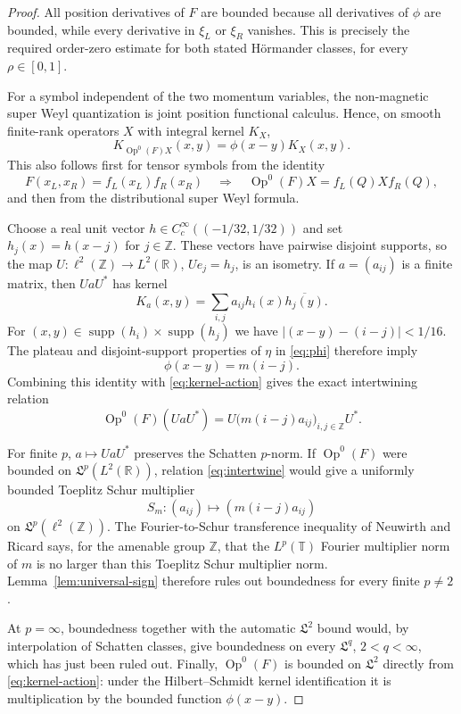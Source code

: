 \documentclass[11pt]{article}
\newcommand{\T}{\mathbb T}
\newcommand{\Z}{\mathbb Z}
\newcommand{\R}{\mathbb R}
\newcommand{\Sp}{\mathfrak L}
\begin{document}
\begin{proof}
All position derivatives of $F$ are bounded because all derivatives of
$\phi$ are bounded, while every derivative in $\xi_L$ or $\xi_R$ vanishes.
This is precisely the required order-zero estimate for both stated
H\"ormander classes, for every $\rho\in[0,1]$.

For a symbol independent of the two momentum variables, the non-magnetic
super Weyl quantization is joint position functional calculus.  Hence, on
smooth finite-rank operators $X$ with integral kernel $K_X$,
\begin{equation}\label{eq:kernel-action}
  K_{\operatorname{Op}^0(F)X}(x,y)=\phi(x-y)K_X(x,y).
\end{equation}
This also follows first for tensor symbols from the identity
\[
  F(x_L,x_R)=f_L(x_L)f_R(x_R)
  \quad\Longrightarrow\quad
  \operatorname{Op}^0(F)X=f_L(Q)Xf_R(Q),
\]
and then from the distributional super Weyl formula.

Choose a real unit vector $h\in C_c^\infty((-1/32,1/32))$ and set
$h_j(x)=h(x-j)$ for $j\in\Z$.  These vectors have pairwise disjoint supports,
so the map $U:\ell^2(\Z)\to L^2(\R)$, $Ue_j=h_j$, is an isometry.  If
$a=(a_{ij})$ is a finite matrix, then $UaU^*$ has kernel
\[
  K_a(x,y)=\sum_{i,j}a_{ij}h_i(x)\overline{h_j(y)}.
\]
For $(x,y)\in\operatorname{supp}(h_i)\times\operatorname{supp}(h_j)$ we have
$|(x-y)-(i-j)|<1/16$.  The plateau and disjoint-support properties of
$\eta$ in \eqref{eq:phi} therefore imply
\[
   \phi(x-y)=m(i-j).
\]
Combining this identity with \eqref{eq:kernel-action} gives the exact
intertwining relation
\begin{equation}\label{eq:intertwine}
  \operatorname{Op}^0(F)(UaU^*)
    =U\bigl(m(i-j)a_{ij}\bigr)_{i,j\in\Z}U^*.
\end{equation}

For finite $p$, $a\mapsto UaU^*$ preserves the Schatten $p$-norm.  If
$\operatorname{Op}^0(F)$ were bounded on $\Sp^p(L^2(\R))$, relation
\eqref{eq:intertwine} would give a uniformly bounded Toeplitz Schur
multiplier
\[
   S_m:(a_{ij})\longmapsto(m(i-j)a_{ij})
\]
on $\Sp^p(\ell^2(\Z))$.  The Fourier-to-Schur transference inequality of
Neuwirth and Ricard \cite[Theorem~2.1]{NeuwirthRicard} says, for the amenable
group $\Z$, that the $L^p(\T)$ Fourier multiplier norm of $m$ is no larger
than this Toeplitz Schur multiplier norm.  Lemma~\ref{lem:universal-sign}
therefore rules out boundedness for every finite $p\ne2$.

At $p=\infty$, boundedness together with the automatic $\Sp^2$ bound would,
by interpolation of Schatten classes, give boundedness on every
$\Sp^q$, $2<q<\infty$, which has just been ruled out.  Finally,
$\operatorname{Op}^0(F)$ is bounded on $\Sp^2$ directly from
\eqref{eq:kernel-action}: under the Hilbert--Schmidt kernel identification it
is multiplication by the bounded function $\phi(x-y)$.
\end{proof}
\end{document}
